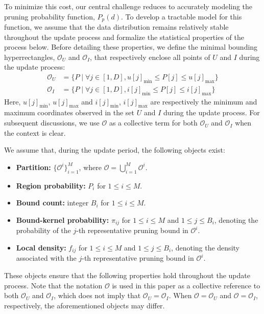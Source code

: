 To minimize this cost, our central challenge reduces to accurately modeling the pruning probability function, $P_p(d)$. To develop a tractable model for this function, we assume that the data distribution remains relatively stable throughout the update process and formalize the statistical properties of the process below. Before detailing these properties, we define the minimal bounding hyperrectangles, $\mathcal{O}_U$ and $\mathcal{O}_I$, that respectively enclose all points of $U$ and $I$ during the update process:
\begin{align}
    \mathcal{O}_U &= \{P \mid \forall j\in[1,D], u[j]_{\min} \le P[j] \le u[j]_{\max}\} \nonumber \\
    \mathcal{O}_I &= \{P \mid \forall j\in[1,D], i[j]_{\min} \le P[j] \le i[j]_{\max}\} \nonumber
\end{align}
Here, $u[j]_{\min}$, $u[j]_{\max}$ and $i[j]_{\min}$, $i[j]_{\max}$ are respectively the minimum and maximum coordinates observed in the set $U$ and $I$ during the update process. For subsequent discussions, we use $\mathcal{O}$ as a collective term for both $\mathcal{O}_U$ and $\mathcal{O}_I$ when the context is clear.

We assume that, during the update period, the following objects exist:

\begin{itemize}
\setlength{\itemsep}{0pt}
\setlength{\parsep}{0pt}
\setlength{\topsep}{0.2ex}
\setlength{\leftmargin}{1.4em}
\item \textbf{Partition:} $\{\mathcal{O}^i\}_{i=1}^{M}$, where $\mathcal{O}=\bigcup_{i=1}^{M}\mathcal{O}^i$.
\item \textbf{Region probability:} $P_i$ for $1\leq i\leq M$.
\item \textbf{Bound count:} integer $B_i$ for $1\leq i\leq M$.
\item \textbf{Bound-kernel probability:} $\pi_{ij}$ for $1\leq i\leq M$ and $1\leq j\leq B_i$, denoting the probability of the $j$-th representative pruning bound in $\mathcal{O}^i$.
\item \textbf{Local density:} $f_{ij}$ for $1\leq i\leq M$ and $1\leq j\leq B_i$, denoting the density associated with the $j$-th representative pruning bound in $\mathcal{O}^i$.
\end{itemize}

These objects ensure that the following properties hold throughout the update process. Note that the notation $\mathcal{O}$ is used in this paper as a collective reference to both $\mathcal{O}_U$ and $\mathcal{O}_I$, which does not imply that $\mathcal{O}_U = \mathcal{O}_I$. When $\mathcal{O} = \mathcal{O}_U$ and $\mathcal{O} = \mathcal{O}_I$, respectively, the aforementioned objects may differ.



